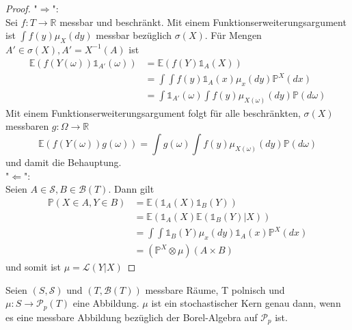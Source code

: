 \begin{proof}
    "$\Rightarrow$": \\
    Sei $f:T\rightarrow \mathbb{R}$ messbar und beschränkt. Mit einem Funktionserweiterungsargument ist $\int f(y)\mu_X(dy)$ messbar bezüglich $\sigma(X)$. Für Mengen $A' \in \sigma(X), A'=X^{-1}(A)$ ist 
    \begin{align*}
    \mathbb{E}(f(Y(\omega))\mathds{1}_{A'}(\omega)) &= \mathbb{E}(f(Y)\mathds{1}_A(X))\\
    &=\int \int f(y) \mathds{1}_A(x)\mu_x(dy)\mathbb{P}^X(dx) \\
    &= \int \mathds{1}_{A'}(\omega) \int f(y)\mu_{X(\omega)}(dy) \mathbb{P}(d\omega)
    \end{align*}
    Mit einem Funktionserweiterungsargument folgt für alle beschränkten, $\sigma(X)$ messbaren $g: \Omega\rightarrow \mathbb{R}$
    $$\mathbb{E}(f(Y(\omega))g(\omega)) = \int g(\omega)\int f(y)\mu_{X(\omega)}(dy)\mathbb{P}(d\omega)$$
    und damit die Behauptung. \\
    "$\Leftarrow$": \\
    Seien $A \in \mathcal{S}, B\in \mathcal{B}(T)$. Dann gilt
    \begin{align*}
        \mathbb{P}(X\in A, Y\in B) &= \mathbb{E}(\mathds{1}_A(X) \mathds{1}_B(Y)) \\
        &= \mathbb{E}(\mathds{1}_A(X)\mathbb{E}(\mathds{1}_B(Y)\vert X)) \\
        &= \int \int \mathds{1}_B(Y) \mu_x(dy) \mathds{1}_A(x)\mathbb{P}^X(dx) \\
        &= (\mathbb{P}^X \otimes \mu)(A\times B)
    \end{align*}
    und somit ist $\mu=\mathcal{L}(Y\vert X)$
\end{proof}
\begin{lemma}\label{thm:kernel_characterization}
    Seien $(S, \mathcal{S})$ und $(T, \mathcal{B}(T))$ messbare Räume, T polnisch und $\mu: S\rightarrow \mathcal{P}_p(T)$ eine Abbildung. $\mu$ ist ein stochastischer Kern genau dann, wenn es eine messbare Abbildung bezüglich der Borel-Algebra auf $\mathcal{P}_p$ ist.
\end{lemma}
